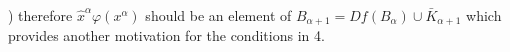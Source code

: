 ) therefore $\hat{x}^\alpha \varphi(x^\alpha)$ should be an element of $B_{\alpha+1} = Df(B_\alpha) \cup \bar{K}_{\alpha+1}$ which provides another motivation for the conditions in 4.
